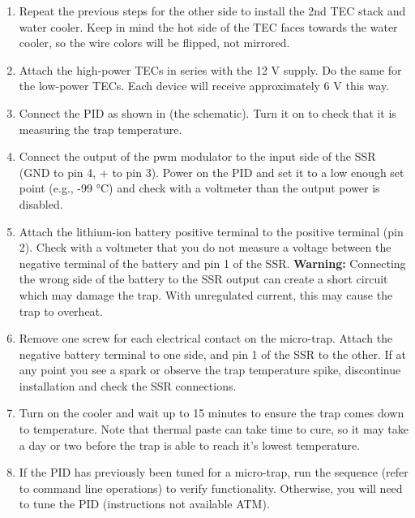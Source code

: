 \begin{enumerate}
\item Repeat the previous steps for the other side to install the 2nd TEC stack and water cooler. Keep in mind the hot side of the TEC faces towards the water cooler, so the wire colors will be flipped, not mirrored.
    
\item Attach the high-power TECs in series with the 12 V supply. Do the same for the low-power TECs. Each device will receive approximately 6 V this way.

\item Connect the PID as shown in (the schematic). Turn it on to check that it is measuring the trap temperature.

\item Connect the output of the pwm modulator to the input side of the SSR (GND to pin 4, + to pin 3). Power on the PID and set it to a low enough set point (e.g., -99 °C) and check with a voltmeter than the output power is disabled.

\item Attach the lithium-ion battery positive terminal to the positive terminal (pin 2). Check with a voltmeter that you do not measure a voltage between the negative terminal of the battery and pin 1 of the SSR. \textbf{Warning:} Connecting the wrong side of the battery to the SSR output can create a short circuit which may damage the trap. With unregulated current, this may cause the trap to overheat.

\item Remove one screw for each electrical contact on the micro-trap. Attach the negative battery terminal to one side, and pin 1 of the SSR to the other. If at any point you see a spark or observe the trap temperature spike, discontinue installation and check the SSR connections.

\item Turn on the cooler and wait up to 15 minutes to ensure the trap comes down to temperature. Note that thermal paste can take time to cure, so it may take a day or two before the trap is able to reach it's lowest temperature.

\item If the PID has previously been tuned for a micro-trap, run the sequence  (refer to command line operations) to verify functionality. Otherwise, you will need to tune the PID (instructions not available ATM).

\end{enumerate}

